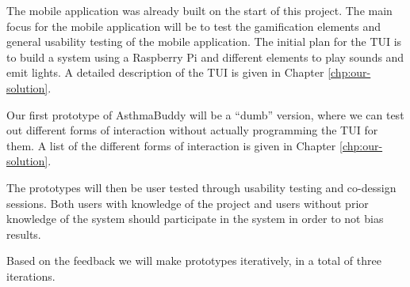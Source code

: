 The mobile application was already built on the start of this project. The main focus for the mobile application will be to test the gamification elements and general usability testing of the mobile application. The initial plan for the TUI is to build a system using a Raspberry Pi and different elements to play sounds and emit lights. A detailed description of the TUI is given in Chapter \ref{chp:our-solution}.

Our first prototype of AsthmaBuddy will be a ``dumb'' version, where we can test out different forms of interaction without actually programming the TUI for them. A list of the different forms of interaction is given in Chapter \ref{chp:our-solution}. 

The prototypes will then be user tested through usability testing and co-dessign sessions. Both users with knowledge of the project and users without prior knowledge of the system should participate in the system in order to not bias results. 

Based on the feedback we will make prototypes iteratively, in a total of three iterations.